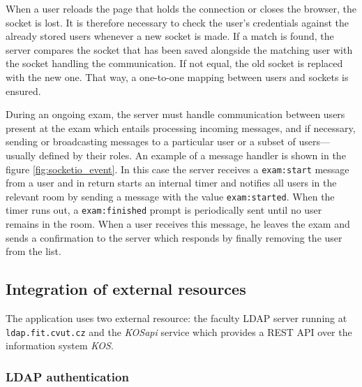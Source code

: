 \documentclass[thesis=M,english,hidelinks]{FITthesis}[2012/10/20]
\newcommand{\code}{\texttt}
\begin{document}
When a user reloads the page that holds the connection or closes the browser, the socket is lost. It is therefore necessary to check the user's credentials against the already stored users whenever a new socket is made. If a match is found, the server compares the socket that has been saved alongside the matching user with the socket handling the communication. If not equal, the old socket is replaced with the new one. That way, a one-to-one mapping between users and sockets is ensured.

During an ongoing exam, the server must handle communication between users present at the exam which entails processing incoming messages, and if necessary, sending or broadcasting messages to a particular user or a subset of users---usually defined by their roles. An example of a message handler is shown in the figure \ref{fig:socketio_event}. In this case the server receives a \code{exam:start} message from a user and in return starts an internal timer and notifies all users in the relevant room by sending a message with the value \code{exam:started}. When the timer runs out, a \code{exam:finished} prompt is periodically sent until no user remains in the room. When a user receives this message, he leaves the exam and sends a confirmation to the server which responds by finally removing the user from the list.

    \subsection{Integration of external resources}

The application uses two external resource: the faculty LDAP server running at \code{ldap.fit.cvut.cz} and the \textit{KOSapi} service which provides a REST API over the information system \textit{KOS}.

      \subsubsection{LDAP authentication}
\end{document}
